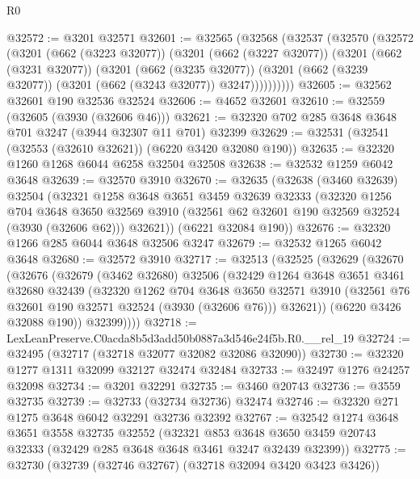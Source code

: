 \begin{lexlean}{R0}
\begin{coremodule}
@32572 := @3201 @32571
@32601 := @32565
    (@32568
      (@32537
        (@32570
          (@32572
            (@3201
              (@662 (@3223 @32077))
              (@3201
                (@662 (@3227 @32077))
                (@3201
                  (@662 (@3231 @32077))
                  (@3201
                    (@662 (@3235 @32077))
                    (@3201 (@662 (@3239 @32077)) (@3201 (@662 (@3243 @32077)) @3247))))))))))
@32605 := @32562 @32601 @190 @32536 @32524
@32606 := @4652 @32601
@32610 := @32559 (@32605 (@3930 (@32606 @46)))
@32621 := @32320 @702 @285 @3648 @3648 @701 @3247 (@3944 @32307 @11 @701) @32399
@32629 := @32531 (@32541 (@32553 (@32610 @32621)) (@6220 @3420 @32080 @190))
@32635 := @32320 @1260 @1268 @6044 @6258 @32504 @32508
@32638 := @32532 @1259 @6042 @3648
@32639 := @32570 @3910
@32670 := @32635
    (@32638
      (@3460 @32639)
      @32504
      (@32321
        @1258
        @3648
        @3651
        @3459
        @32639
        @32333
        (@32320
          @1256
          @704
          @3648
          @3650
          @32569
          @3910
          (@32561 @62 @32601 @190 @32569 @32524 (@3930 (@32606 @62)))
          @32621))
      (@6221 @32084 @190))
@32676 := @32320 @1266 @285 @6044 @3648 @32506 @3247
@32679 := @32532 @1265 @6042 @3648
@32680 := @32572 @3910
@32717 := @32513
    (@32525
      (@32629
        (@32670
          (@32676
            (@32679
              (@3462 @32680)
              @32506
              (@32429
                @1264
                @3648
                @3651
                @3461
                @32680
                @32439
                (@32320
                  @1262
                  @704
                  @3648
                  @3650
                  @32571
                  @3910
                  (@32561 @76 @32601 @190 @32571 @32524 (@3930 (@32606 @76)))
                  @32621))
              (@6220 @3426 @32088 @190))
            @32399))))
@32718 := LexLeanPreserve.C0acda8b5d3add50b0887a3d546e24f5b.R0.__rel_19
@32724 := @32495 (@32717 (@32718 @32077 @32082 @32086 @32090))
@32730 := @32320 @1277 @1311 @32099 @32127 @32474 @32484
@32733 := @32497 @1276 @24257 @32098
@32734 := @3201 @32291
@32735 := @3460 @20743
@32736 := @3559 @32735
@32739 := @32733 (@32734 @32736) @32474
@32746 := @32320 @271 @1275 @3648 @6042 @32291 @32736 @32392
@32767 := @32542
    @1274
    @3648
    @3651
    @3558
    @32735
    @32552
    (@32321
      @853
      @3648
      @3650
      @3459
      @20743
      @32333
      (@32429 @285 @3648 @3648 @3461 @3247 @32439 @32399))
@32775 := @32730 (@32739 (@32746 @32767) (@32718 @32094 @3420 @3423 @3426))

\end{coremodule}
\end{lexlean}
